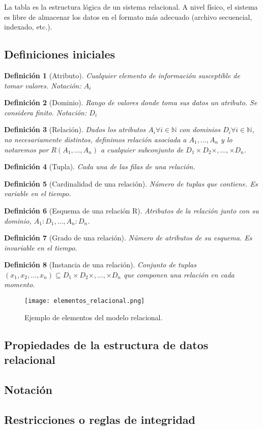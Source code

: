 \documentclass[12pt,spanish]{article}
\newtheorem{definition}{Definición}
\numberwithin{definition}{subsection}
\begin{document}
La tabla es la estructura lógica de un sistema relacional. A nivel físico, el sistema es libre de almacenar los datos en el formato más adecuado (archivo secuencial, indexado, etc.).
\subsection{Definiciones iniciales}

\begin{definition}[Atributo]
	Cualquier elemento de información susceptible de tomar valores. Notación: $A_i$
\end{definition}

\begin{definition}[Dominio]
	Rango de valores donde toma sus datos un atributo. Se considera finito. Notación: $D_i$
\end{definition}

\begin{definition}[Relación]
	Dados los atributos $A_i  \forall i \in \mathbb{N}$ con dominios $D_i  \forall i \in \mathbb{N}$, no necesariamente distintos, definimos relación asociada a $A_1,...,A_n$ y lo notaremos por $R(A_1,...,A_n)$ a cualquier subconjunto de $D_1 \times D_2 \times ,..., \times D_n$.
\end{definition}

\begin{definition}[Tupla]
	Cada una de las filas de una relación.
\end{definition}

\begin{definition}[Cardinalidad de una relación]
	Número de tuplas que contiene. Es variable en el tiempo.
\end{definition}


\begin{definition}[Esquema de una relación R]
	Atributos de la relación junto con su dominio, $A_1 : D_1,..., A_n : D_n$.
\end{definition}

\begin{definition}[Grado de una relación]
	Número de atributos de su esquema. Es invariable en el tiempo.
\end{definition}

\begin{definition}[Instancia de una relación]
	Conjunto de tuplas ${(x_1,x_2,...,x_n)} \subseteq D_1 \times D_2 \times ,..., \times D_n$ que componen una relación en cada momento.
\end{definition}

\begin{figure}[H]
\centering
\texttt{[image: elementos\_relacional.png]}
\caption{Ejemplo de elementos del modelo relacional.}
\end{figure}


\subsection{Propiedades de la estructura de datos relacional}




\subsection{Notación}


\subsection{Restricciones o reglas de integridad}
\end{document}
